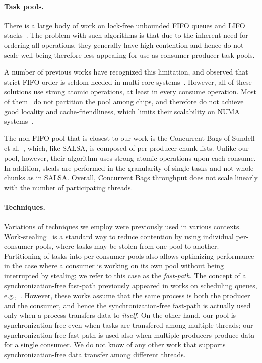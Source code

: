 \paragraph{Task pools.}
There is a large body of work on lock-free unbounded FIFO queues and LIFO
stacks~\cite{Gidenstam:2010:CLQ:1940234.1940266,Hendler:2004:SLS:1007912.1007944,
Hoffman:2007:BQ:1782394.1782423, Michael:1996:SFP:248052.248106,Moir:2005:UEI:1073970.1074013}.
The problem with such algorithms is that due to the inherent need for ordering all operations, they
generally have high contention and hence do not scale well being therefore less appealing for use as 
consumer-producer task pools. 

A number of previous works have recognized this limitation, and observed that strict FIFO
order is seldom needed in multi-core systems~\cite{Afek:2010:SPP:1885276.1885295,springerlink:10.1007/978-3-642-17653-1_29,
Basin:2011:CST:2075029.2075087,Sundell:2011:LAC:1989493.1989550}. However, all of these solutions
use strong atomic operations, at least in every consume operation. Most of
them~\cite{Afek:2010:SPP:1885276.1885295,springerlink:10.1007/978-3-642-17653-1_29,
Basin:2011:CST:2075029.2075087} do not partition the pool among chips, and therefore do not achieve
good locality and cache-friendliness, which limits their scalability on NUMA systems~\cite{Basin:Thesis:2011}.

The non-FIFO pool that is closest to our work is the Concurrent Bags of
Sundell et al.~\cite{Sundell:2011:LAC:1989493.1989550}, which, like SALSA, is composed of
per-producer chunk lists. Unlike our pool, however, their algorithm uses strong atomic operations
upon each consume. In addition, steals are performed in the granularity of single tasks and
not whole chunks as in SALSA. Overall, Concurrent Bags throughput does not scale linearly with the number of participating threads.

\paragraph{Techniques.}
Variations of techniques we employ were previously used in various contexts. 
Work-stealing~\cite{Blumofe:1999:SMC:324133.324234} is a standard way to reduce
contention by using individual per-consumer pools, where tasks may be stolen from one pool to
another. 
Partitioning of tasks into per-consumer pools also allows optimizing performance in the
case where a consumer is working on its own pool without being interrupted by stealing; we refer to
this case as the \emph{fast-path}. The concept of a synchronization-free fast-path previously
appeared in works on scheduling queues,
e.g.,~\cite{Arora:1998:TSM:277651.277678,Hendler:2006:DNW:1160290.1160294}. However, these works
assume that the same process is both the producer and the consumer, and hence the
synchronization-free fast-path is actually used only when a process transfers data to \emph{itself}.
On the other hand, our pool is synchronization-free even when tasks are transfered among multiple
threads; our synchronization-free fast-path is used also when multiple producers produce data for
a single consumer. We do not know of any other work that supports synchronization-free data
transfer among different threads.

